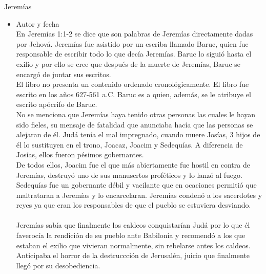 \begin{section}{Jeremías}
\begin{itemize}
			Jeremías se destacó de los demás profetas por su ministerio solitario dado el mensaje que daba de parte de Dios, fue encarcelado en varias ocasiones pero nunca comprometió el mensaje que Dios le había dado.\\
			Jeremías fue muy pobre, contrastando con la vida de Isaías y de Daniel, carente de todo tipo de provisiones para que pudiera cumplir con la tarea que Dios le había dado. Lo rechazaron sus vecinos, su familia, los falsos profetas, los sacerdotes, sus amigos, los reyes y todo aquel que escuchara su mensaje, finalmente fue llevado a Egipto en contra de su voluntad.\\
			Fue considerado como un miserable fracasado, durante 40 años sirvió como mensajero de Dios. Su ministerio fue de los años 627-586 a.C. 
		\item Autor y fecha\\
En Jeremías 1:1-2 se dice que son palabras de Jeremías directamente dadas por Jehová. Jeremías fue asistido por un escriba llamado Baruc, quien fue responsable de escribir todo lo que decía Jeremías. Baruc lo siguió hasta el exilio y por ello se cree que después de la muerte de Jeremías, Baruc se encargó de juntar sus escritos.\\
El libro no presenta un contenido ordenado cronológicamente.
\newpage
El libro fue escrito en los años 627-561 a.C.
Baruc es a quien, además, se le atribuye el escrito apócrifo de Baruc.\\
No se menciona que Jeremías haya tenido otras personas las cuales le hayan sido fieles, su mensaje de fatalidad que anunciaba hacía que las personas se alejaran de él. Judá tenía el mal impregnado, cuando muere Josías, 3 hijos de él lo sustituyen en el trono, Joacaz, Joacim y Sedequías. A diferencia de Josías, ellos fueron pésimos gobernantes.\\
De todos ellos, Joacim fue el que más abiertamente fue hostil en contra de Jeremías, destruyó uno de sus manuscrtos proféticos y lo lanzó al fuego. Sedequías fue un gobernante débil y vacilante que en ocaciones permitió que maltrataran a Jeremías y lo encarcelaran. Jeremías condenó a los sacerdotes y reyes ya que eran los responsables de que el pueblo se estuviera desviando.\\
\\
Jeremías sabía que finalmente los caldeos conquistarían Judá por lo que él faverocía la rendición de su pueblo ante Babilonia y recomendó a los que estaban el exilio que vivieran normalmente, sin rebelarse antes los caldeos. Anticipaba el horror de la destruccción de Jerusalén, juicio que finalmente llegó por su desobediencia.\\

\end{itemize}
\end{section}
